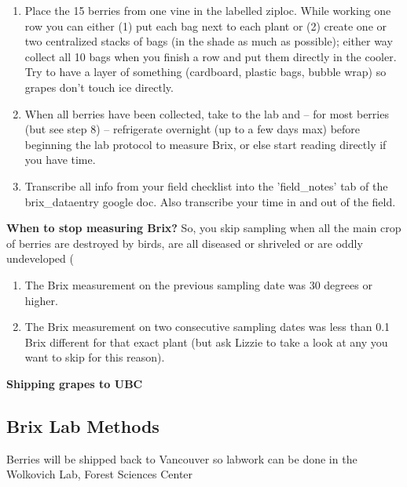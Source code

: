 \documentclass[11pt,letter]{article}
\begin{document}
\begin{enumerate}
\item Place the 15 berries from one vine in the labelled ziploc. While working one row you can either (1) put each bag next to each plant or (2) create one or two centralized stacks of bags (in the shade as much as possible); either way collect all 10 bags when you finish a row and put them directly in the cooler. Try to have a layer of something (cardboard, plastic bags, bubble wrap) so grapes don’t touch ice directly. 

\item When all berries have been collected, take to the lab and -- for most berries (but see step 8) -- refrigerate overnight (up to a few days max) before beginning the lab protocol to measure Brix, or else start reading directly if you have time. 


\item Transcribe all info from your field checklist into the 'field\_notes' tab of the brix\_dataentry google doc. Also transcribe your time in and out of the field. 

\end{enumerate}

{\bf When to stop measuring Brix?}
So, you skip sampling when all the main crop of berries are destroyed by birds, are all diseased or shriveled or are oddly undeveloped (%
\begin{enumerate}
\item The Brix measurement on the previous sampling date was 30 degrees or higher.
\item The Brix measurement on two consecutive sampling dates was less than 0.1 Brix different for that exact plant (but ask Lizzie to take a look at any you want to skip for this reason).
\end{enumerate}

{\bf Shipping grapes to UBC} %

\subsection{Brix Lab Methods}
Berries will be shipped back to Vancouver so labwork can be done in the Wolkovich Lab, Forest Sciences Center
\end{document}
